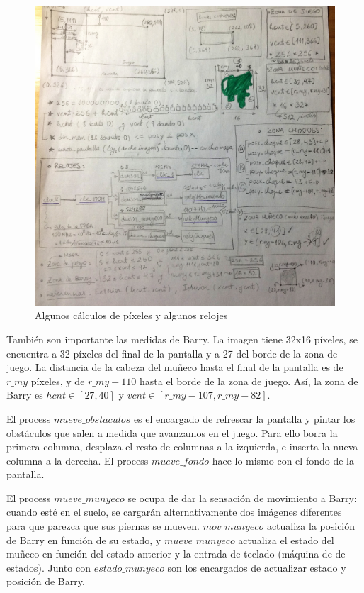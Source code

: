 \documentclass[11pt, a4paper, spanish, openright, twoside]{book}
\begin{document}
	\begin{figure}[!h]
		\centering
		\includegraphics[scale=0.2]{calculos.jpg}
		\caption{Algunos cálculos de píxeles y algunos relojes}
	\end{figure}
	
También son importante las medidas de Barry. La imagen tiene 32x16 píxeles, se encuentra a 32 píxeles del final de la pantalla y a 27 del borde de la zona de juego. La distancia de la cabeza del muñeco hasta el final de la pantalla es de $r\_my$ píxeles, y de $r\_my-110$ hasta el borde de la zona de juego. Así, la zona de Barry es $hcnt \in [27, 40]$ y $vcnt \in [r\_my-107, r\_my -82]$.


El process $mueve\_obstaculos$ es el encargado de refrescar la pantalla y pintar los obstáculos que salen a medida que avanzamos en el juego. Para ello borra la primera columna, desplaza el resto de columnas a la izquierda, e inserta la nueva columna a la derecha. El process $mueve\_fondo$ hace lo mismo con el fondo de la pantalla.


El process $mueve\_munyeco$ se ocupa de dar la sensación de movimiento a Barry: cuando esté en el suelo, se cargarán alternativamente dos imágenes diferentes para que parezca que sus piernas se mueven.
$mov\_munyeco$ actualiza la posición de Barry en función de su estado, y $mueve\_munyeco$ actualiza el estado del muñeco en función del estado anterior y la entrada de teclado (máquina de de estados). Junto con $estado\_munyeco$ son los encargados de actualizar estado y posición de Barry.
\end{document}
